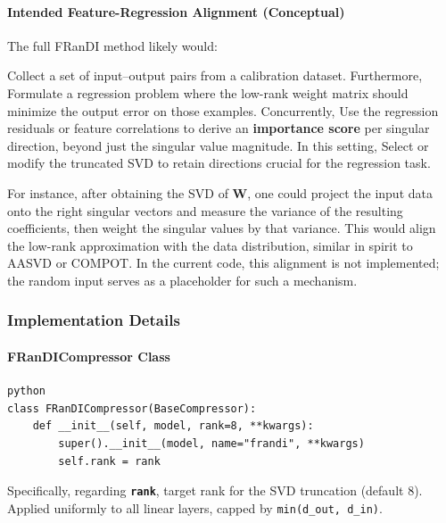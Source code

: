 \paragraph{Intended Feature-Regression Alignment (Conceptual)}

The full FRanDI method likely would:

Collect a set of input--output pairs from a calibration dataset. Furthermore, Formulate a regression problem where the low-rank weight matrix should minimize the output error on those examples. Concurrently, Use the regression residuals or feature correlations to derive an \textbf{importance score} per singular direction, beyond just the singular value magnitude. In this setting, Select or modify the truncated SVD to retain directions crucial for the regression task.


For instance, after obtaining the SVD of \textbf{W}, one could project the input data onto the right singular vectors and measure the variance of the resulting coefficients, then weight the singular values by that variance. This would align the low-rank approximation with the data distribution, similar in spirit to AASVD or COMPOT. In the current code, this alignment is not implemented; the random input serves as a placeholder for such a mechanism.


\subsubsection*{Implementation Details}

\paragraph{FRanDICompressor Class}

\vspace{0.5em}
\begin{mdframed}[backgroundcolor=codebg, linecolor=codeframe, linewidth=1pt, roundcorner=4pt, innerleftmargin=2pt, innerrightmargin=5pt, innertopmargin=5pt, innerbottommargin=5pt]
\begin{lstlisting}
python
class FRanDICompressor(BaseCompressor):
    def __init__(self, model, rank=8, **kwargs):
        super().__init__(model, name="frandi", **kwargs)
        self.rank = rank
\end{lstlisting}
\end{mdframed}
\vspace{0.5em}

Specifically, regarding \textbf{\texttt{rank}}, target rank for the SVD truncation (default 8). Applied uniformly to all linear layers, capped by \texttt{min(d\_out, d\_in)}.


